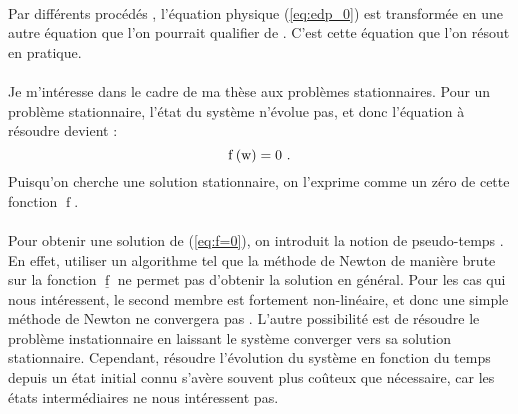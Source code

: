 		\paragraph{}
		Par différents procédés %
		, l'équation physique (\ref{eq:edp_0}) est transformée en une autre équation que l'on pourrait qualifier de %
		.
		C'est cette équation que l'on résout en pratique.

		\paragraph{}
		Je m'intéresse dans le cadre de ma thèse aux problèmes stationnaires.
		Pour un problème stationnaire, l'état du système n'évolue pas, et donc l'équation à résoudre devient :
		\begin{equation}\label{eq:f=0}
			\operatorname{f}\left(\textup{w}\right) = 0\ .
		\end{equation}
		Puisqu'on cherche une solution stationnaire, on l'exprime comme un zéro de cette fonction $\operatorname{f}$.

		\paragraph{}
		Pour obtenir une solution de (\ref{eq:f=0}), on introduit la notion de pseudo-temps \cite{KelleyKeyes1996}.
		En effet, utiliser un algorithme tel que la méthode de Newton de manière brute sur la fonction $\underline{\operatorname{f}}$ ne permet pas d'obtenir la solution en général.
		Pour les cas qui nous intéressent, le second membre est fortement non-linéaire, et donc une simple méthode de Newton ne convergera pas .
		L'autre possibilité est de résoudre le problème instationnaire en laissant le système converger vers sa solution stationnaire.
		Cependant, résoudre l'évolution du système en fonction du temps depuis un état initial connu s'avère souvent plus coûteux que nécessaire, car les états intermédiaires ne nous intéressent pas.


